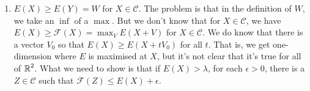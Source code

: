 \documentclass[12pt]{article}
\begin{document}
\begin{enumerate}
\item $E(X) \geq E(Y) = W$ for $X \in \mathcal{C}$. The problem is that in the definition of $W$, we take an $\inf$ of a $\max$. But we don't know that for $X \in \mathcal{C}$, we have $E(X) \geq \mathcal{F}(X) = \max_V E(X + V)$ for $X \in \mathcal{C}$. We do know that there is a vector $V_0$ so that $E(X) \geq E(X + t V_0)$ for all $t$. That is, we get one-dimension where $E$ is maximised at $X$, but it's not clear that it's true for all of $\operatorname{\mathbb{R}}^2$. What we need to show is that if $E(X) > \lambda$, for each $\epsilon > 0$, there is a $Z \in \mathcal{C}$ such that $\mathcal{F} (Z) \leq E(X) + \epsilon$. 
\end{enumerate}
\end{document}

